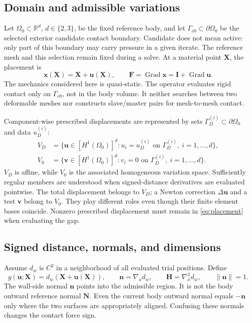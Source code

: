 \documentclass[preprint,11pt]{elsarticle}
\numberwithin{equation}{section}
\newcommand{\bu}{\boldsymbol{u}}
\newcommand{\bv}{\boldsymbol{v}}
\newcommand{\bx}{\boldsymbol{x}}
\newcommand{\bX}{\boldsymbol{X}}
\newcommand{\bn}{\boldsymbol{n}}
\newcommand{\bN}{\boldsymbol{N}}
\newcommand{\bH}{\boldsymbol{H}}
\newcommand{\bI}{\boldsymbol{I}}
\newcommand{\bF}{\boldsymbol{F}}
\newcommand{\Gc}{\Gamma_{c0}}
\newcommand{\Grad}{\operatorname{Grad}}
\begin{document}
\subsection{Domain and admissible variations}
Let $\Omega_0\subset\mathbb{R}^d$, $d\in\{2,3\}$, be the fixed
reference body, and let $\Gc\subset\partial\Omega_0$ be the selected
exterior candidate contact boundary. Candidate does not mean active:
only part of this boundary may carry pressure in a given iterate.
The reference mesh and this selection remain fixed during a solve.
At a material point $\bX$, the placement is
\begin{equation}
 \bx(\bX)=\bX+\bu(\bX),\qquad
 \bF=\Grad\bx=\bI+\Grad\bu.
 \label{eq:placement}
\end{equation}
The mechanics considered here is quasi-static. The operator evaluates rigid
contact only on $\Gc$, not in the body
volume. It neither searches between two deformable meshes nor constructs
slave/master pairs for mesh-to-mesh contact.

Component-wise prescribed displacements are represented by sets
$\Gamma_D^{(i)}\subset\partial\Omega_0$ and data $u_D^{(i)}$:
\begin{align}
 V_D&=\{\bu\in[H^1(\Omega_0)]^d:
       u_i=u_D^{(i)}\text{ on }\Gamma_D^{(i)},\ i=1,\ldots,d\},\\
 V_0&=\{\bv\in[H^1(\Omega_0)]^d:
       v_i=0\text{ on }\Gamma_D^{(i)},\ i=1,\ldots,d\}.
 \label{eq:spaces}
\end{align}
$V_D$ is affine, while $V_0$ is the associated homogeneous variation
space. Sufficiently regular members are understood when signed-distance
derivatives are evaluated pointwise. The total displacement belongs to
$V_D$; a Newton correction $\Delta\bu$ and a test $\bv$ belong to $V_0$.
They play different roles even though their finite element bases coincide.
Nonzero prescribed displacement must remain in \eqref{eq:placement} when
evaluating the gap.

\subsection{Signed distance, normals, and dimensions}
Assume $d_w$ is $C^2$ in a neighborhood of all evaluated trial positions.
Define
\begin{equation}
 g(\bu;\bX)=d_w(\bX+\bu(\bX)),\qquad
 \bn=\nabla_x d_w,\qquad \bH=\nabla_x^2 d_w,
 \qquad \|\bn\|=1.
 \label{eq:distance}
\end{equation}
The wall-side normal $\bn$ points into the admissible region. It is not
the body outward reference normal $\bN$. Even the current body outward
normal equals $-\bn$ only where the two surfaces are appropriately
aligned. Confusing these normals changes the contact force sign.
\end{document}

